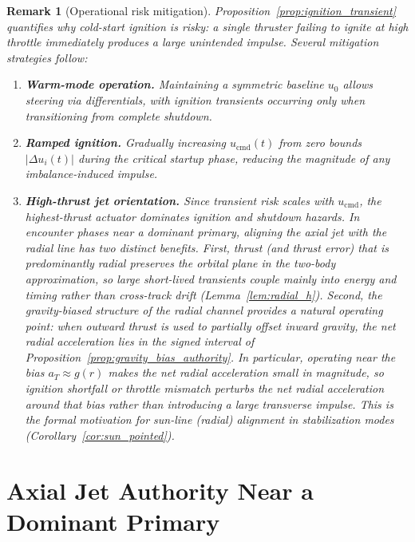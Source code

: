 \documentclass{article}
\newtheorem{remark}{Remark}
\begin{document}
\begin{remark}[Operational risk mitigation]
\label{rem:risk_mitigation}
Proposition~\ref{prop:ignition_transient} quantifies why cold-start ignition is risky: a 
single thruster failing to ignite at high throttle immediately produces a large unintended 
impulse. Several mitigation strategies follow:

\begin{enumerate}
\item[\textup{(i)}] \textbf{Warm-mode operation.}
Maintaining a symmetric baseline $u_0$ allows steering via differentials, with ignition 
transients occurring only when transitioning from complete shutdown.

\item[\textup{(ii)}] \textbf{Ramped ignition.}
Gradually increasing $u_{\mathrm{cmd}}(t)$ from zero bounds $|\Delta u_i(t)|$ during the 
critical startup phase, reducing the magnitude of any imbalance-induced impulse.

\item[\textup{(iii)}] \textbf{High-thrust jet orientation.}
Since transient risk scales with $u_{\mathrm{cmd}}$, the highest-thrust actuator dominates ignition and shutdown hazards. In encounter phases near a dominant primary, aligning the axial jet with the radial line has two distinct benefits. First, thrust (and thrust error) that is predominantly radial preserves the orbital plane in the two-body approximation, so large short-lived transients couple mainly into energy and timing rather than cross-track drift (Lemma~\ref{lem:radial_h}). Second, the gravity-biased structure of the radial channel provides a natural operating point: when outward thrust is used to partially offset inward gravity, the net radial acceleration lies in the signed interval of Proposition~\ref{prop:gravity_bias_authority}. In particular, operating near the bias $a_T\approx g(r)$ makes the \emph{net} radial acceleration small in magnitude, so ignition shortfall or throttle mismatch perturbs the net radial acceleration around that bias rather than introducing a large transverse impulse. This is the formal motivation for sun-line (radial) alignment in stabilization modes (Corollary~\ref{cor:sun_pointed}).
\end{enumerate}
\end{remark}

\section{Axial Jet Authority Near a Dominant Primary}
\label{sec:axial_thrust_theory}
\end{document}
